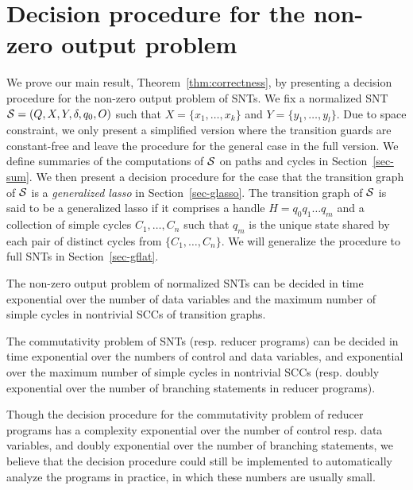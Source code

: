 
\section{Decision procedure for the non-zero output problem}\label{sec:dec-snt}
%
We prove our main result, Theorem~\ref{thm:correctness}, by presenting a decision procedure for the non-zero output problem of SNTs. We fix a normalized SNT ${\mathcal{S} } = (Q,X,Y,\delta,q_0,O)$ such that $X=\{ x_1,\dots, x_k\}$ and $Y = \{y_1,\dots,y_l\}$. Due to space constraint, we only present a simplified version where the transition guards are constant-free and leave the procedure for the general case in the full version.
We define summaries of the computations of ${\mathcal{S} }$ on paths and cycles in Section~\ref{sec-sum}. We then present a decision procedure for the case that the transition graph of ${\mathcal{S} }$ is a \emph{generalized lasso} in Section~\ref{sec-glasso}. The transition graph of ${\mathcal{S} }$ is said to be a generalized lasso if it comprises a handle $H=q_0 q_1 \dots q_m$ and a collection of simple cycles $C_1,\dots,C_n$ such that $q_m$ is the unique state shared by each pair of distinct cycles from $\{C_1,\dots,C_n\}$. We will generalize the procedure to full SNTs in Section~\ref{sec-gflat}.

\begin{theorem}\label{thm:correctness}
The non-zero output problem of normalized SNTs can be decided in time exponential over the number of data variables and the maximum number of simple cycles in nontrivial SCCs of transition graphs.
\end{theorem}
\vspace{-2mm}

\begin{corollary}\label{cor:snt-dec-proc}
The commutativity problem of SNTs (resp. reducer programs) can be decided in time exponential over the numbers of control and data variables, and exponential over the maximum number of simple cycles in nontrivial SCCs (resp. doubly exponential over the number of branching statements in reducer programs). 
\end{corollary}

\begin{remark}
Though the decision procedure for the commutativity problem of reducer programs has a complexity exponential over the number of control resp. data variables, and doubly exponential over the number of branching statements, we believe that the decision procedure could still be implemented to automatically analyze the programs in practice, in which these numbers are usually small. 
\end{remark}

